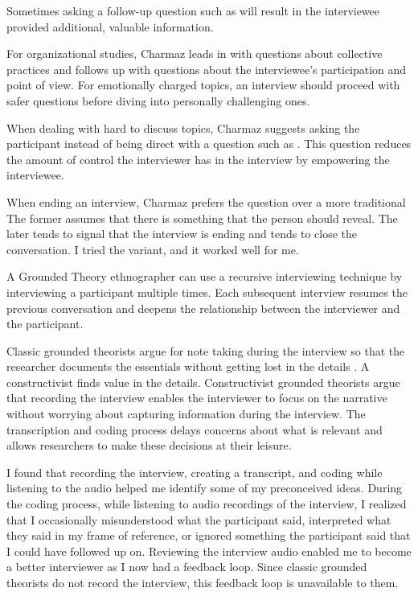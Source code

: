Sometimes asking a follow-up question such as  will result in the interviewee provided additional, valuable information.

For organizational studies, Charmaz leads in with questions about collective practices and follows up with questions about the interviewee's participation and point of view. For emotionally charged topics, an interview should proceed with safer questions before diving into personally challenging ones. 

When dealing with hard to discuss topics, Charmaz suggests asking the participant  instead of being direct with a question such as  \cite{Charmaz}. This question reduces the amount of control the interviewer has in the interview by empowering the interviewee.

When ending an interview, Charmaz prefers the question  over a more traditional  The former assumes that there is something that the person should reveal. The later tends to signal that the interview is ending and tends to close the conversation. I tried the variant,  and it worked well for me.

A Grounded Theory ethnographer can use a recursive interviewing technique by interviewing a participant multiple times. Each subsequent interview resumes the previous conversation and deepens the relationship between the interviewer and the participant. 

Classic grounded theorists argue for note taking during the interview
so that the researcher documents the essentials without getting lost in the details \cite{GlaserTheoreticalSensitivity, GlaserGroundedTheoryPerspective}.  A constructivist finds value in the details. Constructivist grounded theorists argue that recording the interview enables the interviewer to focus on the narrative without worrying about capturing information during the interview. The transcription and coding process delays concerns about what is relevant and allows researchers to make these decisions at their leisure.  

I found that recording the interview, creating a transcript, and coding while listening to the audio helped me identify some of my preconceived ideas. During the coding process, while listening to audio recordings of the interview, I realized that I occasionally misunderstood what the participant said, interpreted what they said in my frame of reference,  or ignored something the participant said that I could have followed up on. Reviewing the interview audio enabled me to become a better interviewer as I now had a feedback loop. Since classic grounded theorists do not record the interview, this feedback loop is unavailable to them.

